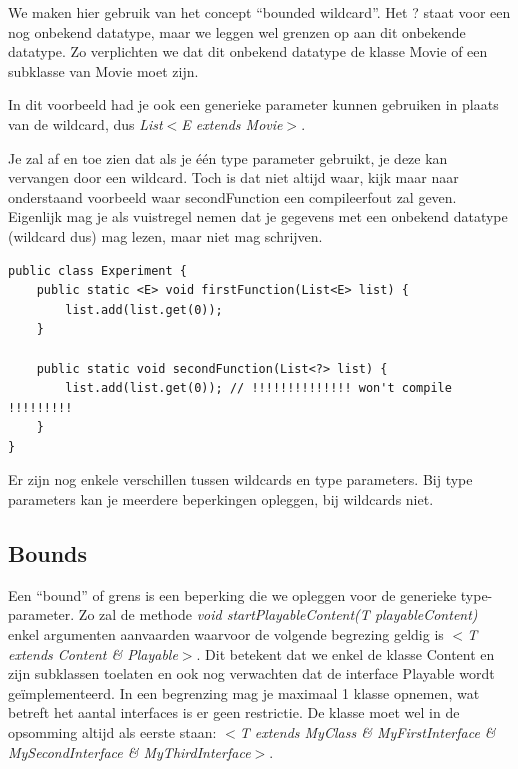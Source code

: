 \documentclass{tstextbook}
\begin{document}
We maken hier gebruik van het concept ``bounded wildcard''. Het ? staat voor een nog onbekend datatype, maar we leggen wel grenzen op aan dit onbekende datatype. Zo verplichten we dat dit onbekend datatype de klasse Movie of een subklasse van Movie moet zijn.

In dit voorbeeld had je ook een generieke parameter kunnen gebruiken in plaats van de wildcard, dus \textit{List$<$E extends Movie$>$}.

Je zal af en toe zien dat als  je \'e\'en type parameter gebruikt, je deze kan vervangen door een wildcard. Toch is dat niet altijd waar, kijk maar naar onderstaand voorbeeld waar secondFunction een compileerfout zal geven.
Eigenlijk mag je als vuistregel nemen dat je gegevens met een onbekend datatype (wildcard dus) mag lezen, maar niet mag schrijven.

\begin{lstlisting}
public class Experiment {
    public static <E> void firstFunction(List<E> list) {
        list.add(list.get(0));
    }

    public static void secondFunction(List<?> list) {
        list.add(list.get(0)); // !!!!!!!!!!!!!! won't compile !!!!!!!!!
    }
}
\end{lstlisting}

Er zijn nog enkele verschillen tussen wildcards en type parameters.
Bij type parameters kan je meerdere beperkingen opleggen, bij wildcards niet.

\subsection{Bounds}

Een ``bound'' of grens is een beperking die we opleggen voor de generieke type-parameter. 
Zo zal de methode \textit{void startPlayableContent(T playableContent)} enkel argumenten aanvaarden waarvoor de volgende begrezing geldig is \textit{$<$T extends Content \& Playable$>$}. Dit betekent dat we enkel de klasse Content en zijn subklassen toelaten en ook nog verwachten dat de interface Playable wordt ge\"implementeerd. 
In een begrenzing mag je maximaal 1 klasse opnemen, wat betreft het aantal interfaces is er geen restrictie. De klasse moet wel in de opsomming altijd als eerste staan:
\textit{
$<$T extends MyClass \& MyFirstInterface \& MySecondInterface \& MyThirdInterface$>$}.
\end{document}
